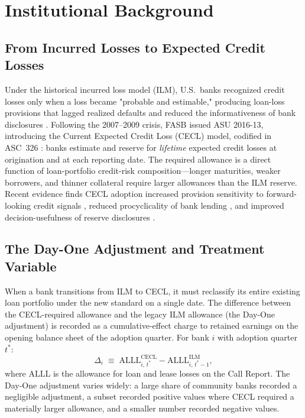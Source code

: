\section{Institutional Background}
\label{sec:background}

\subsection{From Incurred Losses to Expected Credit Losses}
\label{sec:background:transition}

Under the historical incurred loss model (ILM), U.S.\ banks recognized
credit losses only when a loss became "probable and estimable,"
producing loan-loss provisions that lagged realized defaults
\citep{beatty2011delays} and reduced the informativeness of bank
disclosures \citep{bushman2012accounting, bushman2015delayed}.  Following
the 2007--2009 crisis, FASB issued ASU 2016-13, introducing the Current
Expected Credit Loss (CECL) model, codified in ASC~326
\citep{FASB2016}: banks estimate and reserve for \emph{lifetime}
expected credit losses at origination and at each reporting date.  The
required allowance is a direct function of loan-portfolio credit-risk
composition---longer maturities, weaker borrowers, and thinner collateral
require larger allowances than the ILM reserve.  Recent evidence finds
CECL adoption increased provision sensitivity to forward-looking credit
signals \citep{granja2025current, kim2026current}, reduced procyclicality
of bank lending \citep{chen2022does}, and improved decision-usefulness of
reserve disclosures \citep{gee2022decision}.

\subsection{The Day-One Adjustment and Treatment Variable}
\label{sec:background:dayone}

When a bank transitions from ILM to CECL, it must reclassify its entire
existing loan portfolio under the new standard on a single date.  The
difference between the CECL-required allowance and the legacy ILM allowance
(the Day-One adjustment) is recorded as a cumulative-effect charge to
retained earnings on the opening balance sheet of the adoption quarter.  For
bank $i$ with adoption quarter $t^{*}$:
\begin{equation}
  \Delta_i
  \;\equiv\;
  \mathrm{ALLL}^{\mathrm{CECL}}_{i,\,t^{*}}
  -
  \mathrm{ALLL}^{\mathrm{ILM}}_{i,\,t^{*}-1},
  \label{eq:dayone}
\end{equation}
where $\mathrm{ALLL}$ is the allowance for loan and lease losses on the Call
Report.  The Day-One adjustment varies widely: a large share of community
banks recorded a negligible adjustment, a subset recorded positive values
where CECL required a materially larger allowance, and a smaller number
recorded negative values.

